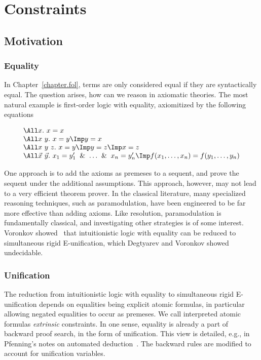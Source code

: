 
\chapter{Constraints}\label{chapter.constraints}

\section{Motivation}

\subsection{Equality}

In Chapter~\ref{chapter.fol}, terms are only considered equal if they
are syntactically equal.  The question arises,
how can we reason in axiomatic theories. The most natural example
is first-order logic with equality, axiomitized by the following
equations

\[
\begin{array}{l}
  \All x.~x = x
  \\
  \All x~y.~x = y \Imp y = x
  \\
  \All x~y~z.~x = y \Imp y = z\Imp x = z
  \\
  \All \vec{x}~\vec{y}.~
  x_1=y_1'\And \ldots\And x_n=y_n'\Imp f(x_1,\ldots,x_n) = f(y_1,\ldots,y_n)
\end{array}
\]

\noindent
One approach is to add the axioms as premeses to a sequent, and prove the
sequent under the additional assumptions.  This approach, however, may not lead
to a very efficient theorem prover.  In the classical literature, many
specialized reasoning techniques, such as paramodulation, have been engineered
to be far more effective than adding axioms.  Like resolution, paramodulation is
fundamentally classical, and investigating other strategies is of some interest.
Voronkov showed~\cite{Voronkov.1996.CADE} that intuitionistic logic with
equality can be reduced to simultaneous rigid E-unification, which Degtyarev and
Voronkov showed~\cite{Degtyarev.1996.TCS} undecidable.

\subsection{Unification}

The reduction from intuitionistic logic with equality to simultaneous rigid
E-unification depends on equalities being explicit atomic formulas, in
particular allowing negated equalities to occur as premeses.  We
call interpreted atomic formulas \emph{extrinsic} constraints.
In one sense, equality is already a part of backward proof search,
in the form of unification.
This view is detailed, e.g., in Pfenning's notes on automated
deduction~\cite[Section 4.3-4.4]{Pfenning.2004.TheoremProvingLectureNotes}.
The backward rules are modified to account for unification variables.

